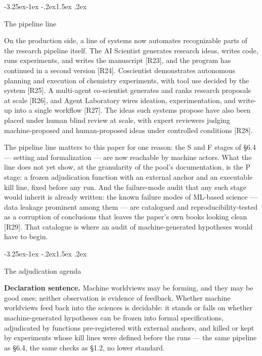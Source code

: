 \documentclass[11pt,a4paper]{article}
\makeatletter
\renewcommand\subsection{\@startsection{subsection}{2}{\z@}%
  {-3.25ex\@plus -1ex \@minus -.2ex}{1.5ex \@plus .2ex}%
  {\normalfont\large\bfseries\raggedright}}
\makeatother
\begin{document}
\subsection{The pipeline line}

On the production side, a line of systems now automates recognizable parts of the research pipeline itself. The AI Scientist generates research ideas, writes code, runs experiments, and writes the manuscript [R23], and the program has continued in a second version [R24]. Coscientist demonstrates autonomous planning and execution of chemistry experiments, with tool use decided by the system [R25]. A multi-agent co-scientist generates and ranks research proposals at scale [R26], and Agent Laboratory wires ideation, experimentation, and write-up into a single workflow [R27]. The ideas such systems propose have also been placed under human blind review at scale, with expert reviewers judging machine-proposed and human-proposed ideas under controlled conditions [R28].

The pipeline line matters to this paper for one reason: the S and F stages of §6.4 — setting and formalization — are now reachable by machine actors. What the line does not yet show, at the granularity of the pool's documentation, is the P stage: a frozen adjudication function with an external anchor and an executable kill line, fixed before any run. And the failure-mode audit that any such stage would inherit is already written: the known failure modes of ML-based science — data leakage prominent among them — are catalogued and reproducibility-tested as a corruption of conclusions that leaves the paper's own books looking clean [R29]. That catalogue is where an audit of machine-generated hypotheses would have to begin.

\subsection{The adjudication agenda}

\textbf{Declaration sentence.} Machine worldviews may be forming, and they may be good ones; neither observation is evidence of feedback. Whether machine worldviews feed back into the sciences is decidable: it stands or falls on whether machine-generated hypotheses can be frozen into formal specifications, adjudicated by functions pre-registered with external anchors, and killed or kept by experiments whose kill lines were defined before the runs — the same pipeline as §6.4, the same checks as §1.2, no lower standard.
\end{document}
